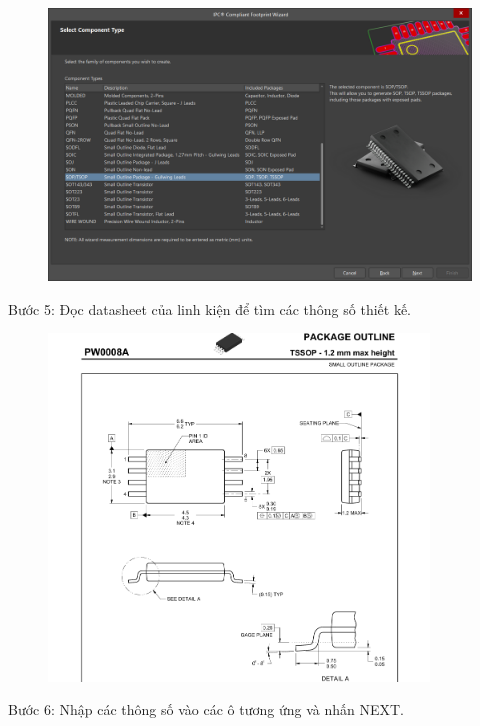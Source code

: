                 \begin{figure}[H]
                    \centering
                    \includegraphics[width=1\textwidth]{pictures/ch3.6.png}
                \end{figure}
                \cleardoublepage
                Bước 5: Đọc datasheet của linh kiện để tìm các thông số thiết kế.
                \begin{figure}[H]
                    \centering
                    \includegraphics[width=0.9\textwidth]{pictures/ch3.7.png}
                \end{figure}
                Bước 6: Nhập các thông số vào các ô tương ứng và nhấn NEXT.
